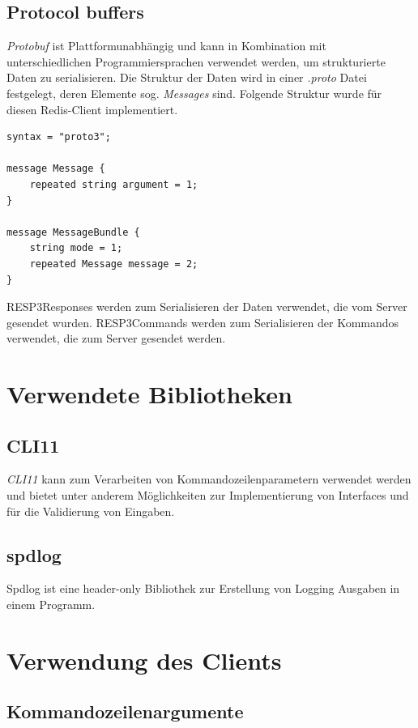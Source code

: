 \documentclass[12pt, letterpaper]{article}
\newenvironment{code}{\captionsetup{type=listing}}{}
\begin{document}
\subsection{Protocol buffers}\label{sec:proto}
\textit{Protobuf}\cite{protobuf} ist Plattformunabhängig und kann in Kombination mit unterschiedlichen Programmiersprachen verwendet werden, um strukturierte Daten zu serialisieren. Die Struktur der Daten wird in einer \textit{.proto} Datei festgelegt, deren Elemente sog. \textit{Messages} sind. Folgende Struktur wurde für diesen Redis-Client implementiert.
\begin{code}
\begin{verbatim}
syntax = "proto3";

message Message {
    repeated string argument = 1;
}

message MessageBundle {
    string mode = 1;
    repeated Message message = 2;
}
\end{verbatim}
\end{code}
RESP3Responses werden zum Serialisieren der Daten verwendet, die vom Server gesendet wurden. RESP3Commands werden zum Serialisieren der Kommandos verwendet, die zum Server gesendet werden.

\section{Verwendete Bibliotheken}
\label{sec:biblio}

\subsection{CLI11}
\textit{CLI11}\cite{cli11} kann zum Verarbeiten von Kommandozeilenparametern verwendet werden und bietet unter anderem Möglichkeiten zur Implementierung von Interfaces und für die Validierung von Eingaben.

\subsection{spdlog}
Spdlog ist eine header-only Bibliothek zur Erstellung von Logging Ausgaben in einem Programm.

\section{Verwendung des Clients}
\label{usage}

\subsection{Kommandozeilenargumente}
\end{document}
